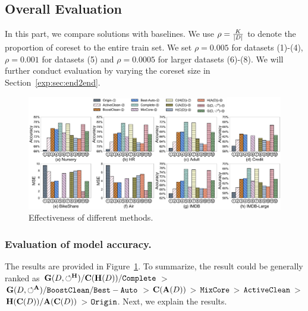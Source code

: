 


\subsection{Overall Evaluation}\label{exp:sec:overall}


In this part, we compare \ours solutions with baselines. We use $\rho = \frac{K}{|D|}$ to denote the proportion of coreset  to the entire train set.  %
We set  $\rho=0.005$ for datasets (1)-(4), $\rho=0.001$ for datasets (5) and  $\rho=0.0005$ for larger datasets (6)-(8).
 We  will further  conduct evaluation by varying the coreset size  in Section~\ref{exp:sec:end2end}.
 \begin{figure}
	\centering
	\includegraphics[width=\textwidth]{figs/effectiveness_old}
	\vspace{-2.5em}
	\caption{Effectiveness of different methods.}
	\label{fig:effectiveness_old}
	\vspace*{-1.em}
\end{figure}



\subsubsection{Evaluation of model accuracy.}
The results are provided in Figure~\ref{fig:effectiveness_old}. To summarize, the result could be generally ranked as $\mathbf{G}(D,\circlearrowleft^\mathbf{H})/\mathbf{C}(\mathbf{H}(D))/{\tt Complete}$ >  $\mathbf{G}(D,\circlearrowleft^\mathbf{A})/{\tt BoostClean} /{\tt Best-Auto} $ > $\mathbf{C}(\mathbf{A}(D))$ > ${\tt MixCore}$ > ${\tt ActiveClean}$ > $\mathbf{H}(\mathbf{C}(D))/\mathbf{A}(\mathbf{C}(D))$ > ${\tt Origin}$.
Next, we explain the results.

